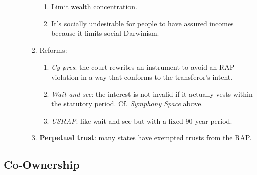 \begin{enumerate}
\begin{enumerate}
\begin{enumerate}
\begin{enumerate}
                \item Limit wealth concentration.
                \item It's socially undesirable for people to have assured 
                incomes because it limits social Darwinism.
            \end{enumerate}
            \item Reforms:
            \begin{enumerate}
                \item \emph{Cy pres}: the court rewrites an instrument to 
                avoid an RAP violation in a way that conforms to the 
                transferor's intent.
                \item \emph{Wait-and-see}: the interest is not invalid if it 
                actually vests within the statutory period. Cf. \emph{Symphony 
                Space} above.
                \item \emph{USRAP}: like wait-and-see but with a fixed 90 year 
                period.
            \end{enumerate}
            \item \textbf{Perpetual trust}: many states have exempted trusts 
            from the RAP.
        \end{enumerate}
    \end{enumerate}
\end{enumerate}

\subsection{Co-Ownership}


